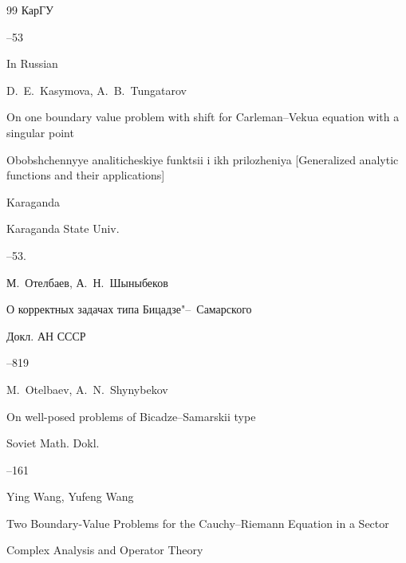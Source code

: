 \begin{thebibliography}{99}
\publ КарГУ


--53

\misctransl

\lang In Russian

\by D.~E.~Kasymova, A.~B.~Tungatarov

\paper On one boundary value problem with shift for Carleman--Vekua equation with a singular point

\inbook Obobshchennyye analiticheskiye funktsii i ikh prilozheniya \rm [Generalized analytic functions and their applications]

\publaddr Karaganda

\publ Karaganda State Univ.


--53.






\by М.~Отелбаев, А.~Н.~Шыныбеков

\paper  О корректных задачах типа Бицадзе"--~Самарского

\jour Докл. АН СССР




--819


\transl


\by M.~Otelbaev, A.~N.~Shynybekov

\paper On well-posed problems of Bicadze--Samarskii type

\jour Soviet Math. Dokl.



--161 





\by Ying Wang, Yufeng Wang

\paper  Two Boundary-Value Problems for the Cauchy–Riemann Equation in a Sector

\jour Complex Analysis and Operator Theory




\end{thebibliography}
